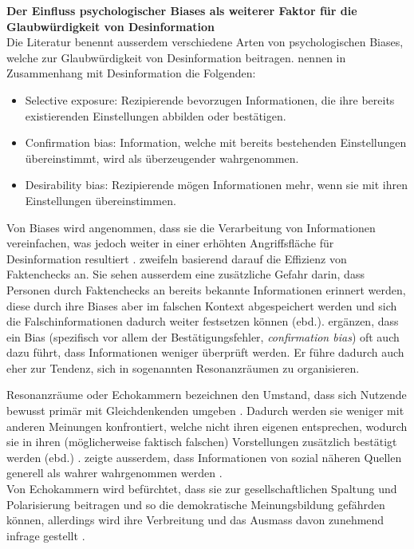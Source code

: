 \documentclass[12pt,a4paper]{article}        %
\begin{document}
\textbf{Der Einfluss psychologischer Biases als weiterer Faktor für die Glaubwürdigkeit von Desinformation}\\
Die Literatur benennt ausserdem verschiedene Arten von psychologischen Biases, welche zur Glaubwürdigkeit von Desinformation beitragen. \textcite{lazer_science_2018} nennen in Zusammenhang mit Desinformation die Folgenden:
\begin{itemize}
  \item{Selective exposure}: Rezipierende bevorzugen Informationen, die ihre bereits existierenden Einstellungen abbilden oder bestätigen.
  \item{Confirmation bias}: Information, welche mit bereits bestehenden Einstellungen übereinstimmt, wird als überzeugender wahrgenommen.
  \item{Desirability bias}: Rezipierende mögen Informationen mehr, wenn sie mit ihren Einstellungen übereinstimmen.
\end{itemize}
Von Biases wird angenommen, dass sie die Verarbeitung von Informationen vereinfachen, was jedoch weiter in einer erhöhten Angriffsfläche für Desinformation resultiert \parencite[5]{tandoc_jr_facts_2019}.  \textcite[1095]{lazer_science_2018} zweifeln basierend darauf die Effizienz von Faktenchecks an. Sie sehen ausserdem eine zusätzliche Gefahr darin, dass Personen durch Faktenchecks an bereits bekannte Informationen erinnert werden, diese durch ihre Biases aber im falschen Kontext abgespeichert werden und sich die Falschinformationen dadurch weiter festsetzen können (ebd.). \textcite[250]{hohlfeld_schlechte_2020} ergänzen, dass ein Bias (spezifisch vor allem der Bestätigungsfehler, \textit{confirmation bias}) oft auch dazu führt, dass Informationen weniger überprüft werden. Er führe dadurch auch eher zur Tendenz, sich in sogenannten Resonanzräumen zu organisieren.

\pagebreak
Resonanzräume oder Echokammern bezeichnen den Umstand, dass sich Nutzende bewusst primär mit Gleichdenkenden umgeben \parencite[250]{hohlfeld_schlechte_2020}.  Dadurch werden sie weniger mit anderen Meinungen konfrontiert, welche nicht ihren eigenen entsprechen, wodurch sie in ihren (möglicherweise faktisch falschen) Vorstellungen zusätzlich bestätigt werden (ebd.) \parencites[vgl.\ auch][8]{zoglauer_konstruierte_2021}[222]{schmidt_meinungsbildung_2022}[195]{krafft_disinformation_2020}[8]{grujic_warnhinweise_2024}[221]{allcott_social_2017}. \textcite[139]{tandoc_jr_defining_2018} zeigte ausserdem, dass Informationen von sozial näheren Quellen generell als wahrer wahrgenommen werden \parencite[vgl.\ auch][42]{levak_disinformation_2020}. \\
Von Echokammern wird befürchtet, dass sie zur gesellschaftlichen Spaltung und Polarisierung beitragen \parencite[8]{zoglauer_konstruierte_2021} und so die demokratische Meinungsbildung gefährden können, allerdings wird ihre Verbreitung und das Ausmass davon zunehmend infrage gestellt \parencite[222]{schmidt_meinungsbildung_2022}.
\end{document}
